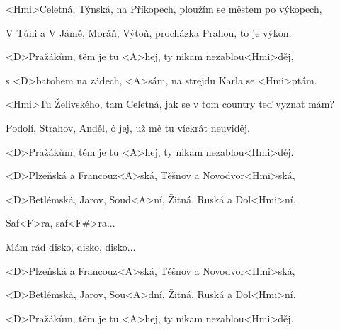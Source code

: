 

\zs
<Hmi>Celetná, Týnská, na Příkopech,
ploužím se městem po výkopech,

V Tůni a V Jámě, Moráň, Výtoň,
procházka Prahou, to je výkon.
\ks

\zr
<D>Pražákům, těm je tu <A>hej,
ty nikam nezablou<Hmi>děj,

s <D>batohem na zádech, <A>sám,
na strejdu Karla se <Hmi>ptám.
\kr

\zs
<Hmi>Tu Želivského, tam Celetná,
jak se v tom country teď vyznat mám?

Podolí, Strahov, Anděl, ó jej,
už mě tu víckrát neuviděj.
\ks

\zr
<D>Pražákům, těm je tu <A>hej,
ty nikam nezablou<Hmi>děj.

<D>Plzeňská a Francouz<A>ská,
Těšnov a Novodvor<Hmi>ská,

<D>Betlémská, Jarov, Soud<A>ní,
Žitná, Ruská a Dol<Hmi>ní,

Saf<F>ra, saf<F#>ra...

Mám rád disko, disko, disko...
\kr


\zr
<D>Plzeňská a Francouz<A>ská,
Těšnov a Novodvor<Hmi>ská,

<D>Betlémská, Jarov, Sou<A>dní,
Žitná, Ruská a Dol<Hmi>ní.
\kr

\zr
<D>Pražákům, těm je tu <A>hej,
ty nikam nezablou<Hmi>děj.
\kr
\kp



